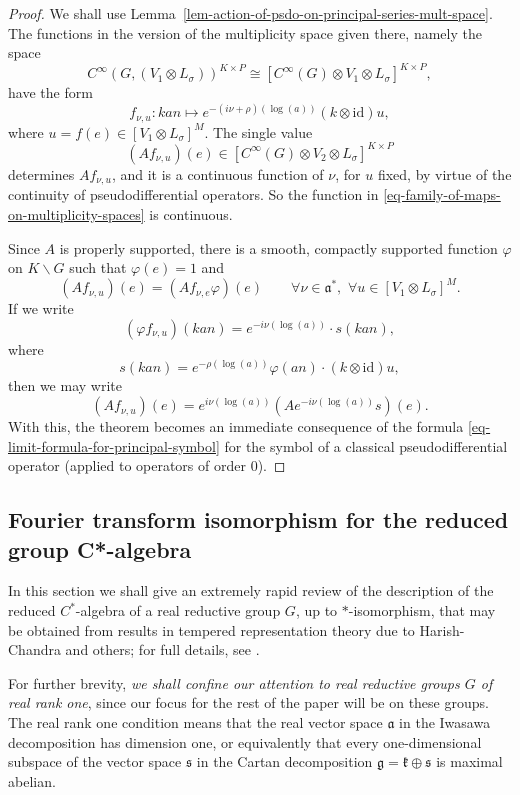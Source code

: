 \documentclass[leqno,11pt]{amsart}
\numberwithin{equation}{subsection}
\theoremstyle{plain}
\theoremstyle{definition}
\theoremstyle{remark}
\begin{document}
\begin{proof} 
We shall use Lemma~\ref{lem-action-of-psdo-on-principal-series-mult-space}. The functions in the version of the multiplicity space given there,  namely the space 
\[
C^\infty  (G, (V_1\otimes L_\sigma) )^{K\times P}  \cong [C^\infty (G)\otimes  V_1\otimes L_\sigma ]^{K\times P},
\]
have the form 
\[
f_{\nu,u}\colon kan\longmapsto e^{-(i\nu+\rho) (\log (a))} (k\otimes \mathrm{id}) u ,
\]
where $u=f(e) \in [V_1\otimes L_\sigma ]^M $.  The single value
\[
(Af_{\nu,u})(e) \in [C^\infty (G) \otimes V_2\otimes L_\sigma ]^{K\times P}
\]
determines $Af_{\nu,u}$, and it is a continuous function of $\nu$, for $u$ fixed,  by virtue of the continuity of pseudodifferential operators. So the function in \eqref{eq-family-of-maps-on-multiplicity-spaces} is continuous.

Since $A$ is properly supported, there is a smooth, compactly supported function $\varphi$ on $K \backslash G$  such that $\varphi (e)=1$ and 
\[
(Af_{\nu,u})(e) = (Af_{\nu,e}\varphi) (e)\qquad \forall \nu\in \mathfrak{a}^*,\,\, \forall u\in [V_1\otimes L_\sigma ]^M.
\]
If we write 
\[
(\varphi f_{\nu,u})(kan) =  e^{-i\nu (\log (a))} \cdot s(kan)  ,
\]
where 
\[
s(kan) = e^{-\rho (\log(a))} \varphi (an) \cdot (k\otimes \mathrm{id}) u , 
\]
then we may write 
\[
(Af_{\nu,u})(e) = e^{i \nu (\log(a))} (Ae^{-i \nu (\log(a))} s)(e).
\]
With this, the theorem becomes an immediate consequence of the formula \eqref{eq-limit-formula-for-principal-symbol} for the symbol of a classical pseudodifferential operator (applied to operators of order $0$).
\end{proof} 

 
\subsection{Fourier transform isomorphism for the reduced group C*-algebra} 
\label{subsec-fourier-transform-of-c-star-algebra}
In this section we shall
give an extremely rapid  review  of the description of the reduced $C^*$-algebra of a real reductive group $G$, up to $*$-isomorphism, that may be obtained from results in tempered representation theory due to Harish-Chandra and others; for full details, see \cite{ClareCrispHigson16}.

For further brevity, \emph{we shall confine our attention to  real reductive groups $G$ of real rank one}, since our focus for the rest of  the paper will be on these groups. The real rank one condition means that the real vector space $\mathfrak{a}$ in the Iwasawa decomposition has dimension one, or equivalently that every one-dimensional subspace of the vector space $\mathfrak{s}$ in the Cartan decomposition $\mathfrak{g} = \mathfrak{k} \oplus \mathfrak{s}$ is maximal abelian.
 
\end{document}
